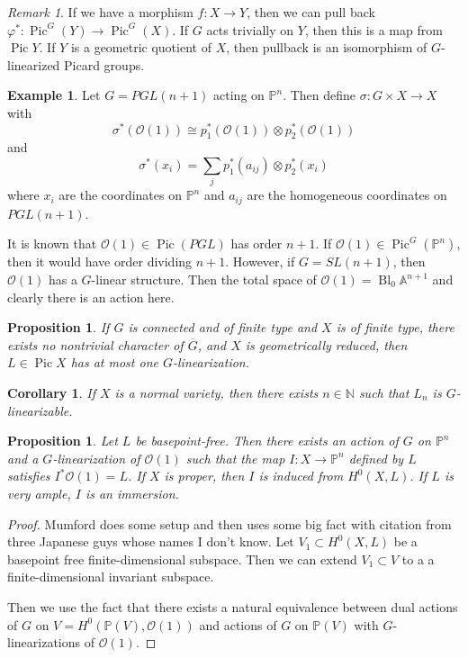 \documentclass[leqno, openany]{memoir}
\newtheorem{cor}[thm]{Corollary}
\newtheorem{prop}[thm]{Proposition}
\theoremstyle{definition}
\newtheorem{exm}[thm]{Example}
\theoremstyle{remark}
\newtheorem{rmk}[thm]{Remark}
\theoremstyle{plain}
\theoremstyle{definition}
\theoremstyle{remark}
\newcommand{\A}{\mathbb{A}}
\newcommand{\N}{\mathbb{N}}
\renewcommand{\P}{\mathbb{P}}
\newcommand{\mc}[1]{\mathcal{#1}}
\newcommand{\ol}[1]{\overline{#1}}
\DeclareMathOperator{\Pic}{Pic}
\begin{document}
\begin{rmk} If we have a morphism $f \colon X \to Y$, then we can pull back
    $\varphi^* \colon \Pic^G(Y) \to \Pic^G(X)$. If $G$ acts trivially on $Y$,
    then this is a map from $\Pic Y$. If $Y$ is a geometric quotient of $X$,
    then pullback is an isomorphism of $G$-linearized Picard groups.  \end{rmk}

\begin{exm} Let $G = PGL(n+1)$ acting on $\P^n$. Then define $\sigma \colon G
    \times X \to X$ with \[ \sigma^*(\mc{O}(1)) \cong p_1^*(\mc{O}(1)) \otimes
        p_2^*(\mc{O}(1)) \] and \[ \sigma^*(x_i) = \sum_j p_1^*(a_{ij}) \otimes
    p_2^*(x_i) \] where $x_i$ are the coordinates on $\P^n$ and $a_{ij}$ are
    the homogeneous coordinates on $PGL(n+1)$.

    It is known that $\mc{O}(1) \in \Pic(PGL)$ has order $n+1$. If $\mc{O}(1)
\in \Pic^G(\P^n)$, then it would have order dividing $n+1$. However, if $G =
SL(n+1)$, then $\mc{O}(1)$ has a $G$-linear structure. Then the total space of
$\mc{O}(1) = \operatorname{Bl}_0 \A^{n+1}$ and clearly there is an action here.
\end{exm}

\begin{prop} If $G$ is connected and of finite type and $X$ is of finite type,
there exists no nontrivial character of $\ol{G}$, and $X$ is geometrically
reduced, then $L \in \Pic X$ has at most one $G$-linearization.  \end{prop}

\begin{cor} If $X$ is a normal variety, then there exists $n \in \N$ such that
$L_n$ is $G$-linearizable.  \end{cor}

\begin{prop} Let $L$ be basepoint-free. Then there exists an action of $G$ on
    $\P^n$ and a $G$-linearization of $\mc{O}(1)$ such that the map $I \colon X
    \to \P^n$ defined by $L$ satisfies $I^* \mc{O}(1) = L$. If $X$ is proper,
    then $I$ is induced from $H^0(X,L)$. If $L$ is very ample, $I$ is an
    immersion.  \end{prop}

\begin{proof} Mumford does some setup and then uses some big fact with citation
    from three Japanese guys whose names I don't know. Let $V_1 \subset
    H^0(X,L)$ be a basepoint free finite-dimensional subspace. Then we can
    extend $V_1 \subset V$ to a a finite-dimensional invariant subspace.

    Then we use the fact that there exists a natural equivalence between dual
actions of $G$ on $V = H^0(\P(V), \mc{O}(1))$ and actions of $G$ on $\P(V)$
with $G$-linearizations of $\mc{O}(1)$.  \end{proof}
\end{document}
